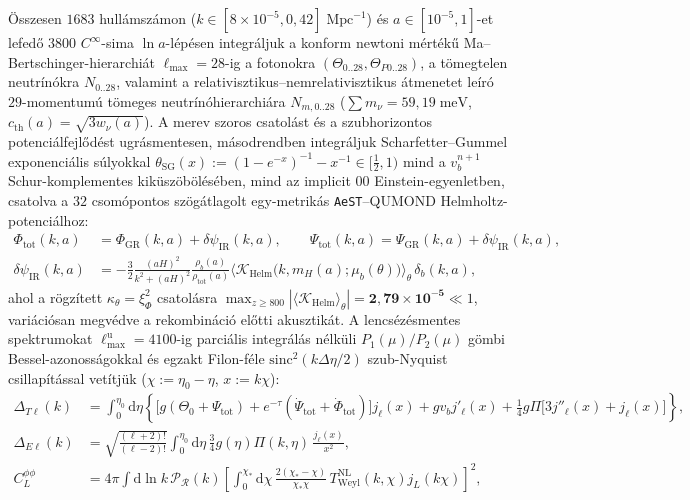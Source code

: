 \documentclass[11pt,a4paper]{article}
\begin{document}
Összesen $1683$ hullámszámon ($k \in [8\times 10^{-5}, 0{,}42]\;\mathrm{Mpc}^{-1}$) és $a \in [10^{-5}, 1]$-et lefedő $3800$ $C^\infty$-sima $\ln a$-lépésen integráljuk a konform newtoni mértékű Ma--Bertschinger-hierarchiát \cite{MaBertschinger1995} $\ell_{\max} = 28$-ig a fotonokra $(\Theta_{0..28}, \Theta_{P0..28})$, a tömegtelen neutrínókra $N_{0..28}$, valamint a relativisztikus--nemrelativisztikus átmenetet leíró $29$-momentumú tömeges neutrínóhierarchiára $N_{m,0..28}$ ($\sum m_\nu = 59{,}19\;\mathrm{meV}$, $c_{\mathrm{th}}(a) = \sqrt{3 w_\nu(a)}$). A merev szoros csatolást és a szubhorizontos potenciálfejlődést ugrásmentesen, másodrendben integráljuk Scharfetter--Gummel exponenciális súlyokkal $\theta_{\mathrm{SG}}(x) := (1 - e^{-x})^{-1} - x^{-1} \in [\frac{1}{2}, 1)$ mind a $v_b^{n+1}$ Schur-komplementes kiküszöbölésében, mind az implicit $00$ Einstein-egyenletben, csatolva a $32$ csomópontos szögátlagolt egy-metrikás \texttt{AeST}--QUMOND Helmholtz-potenciálhoz:
\begin{equation}
\begin{aligned}
  \Phi_{\mathrm{tot}}(k,a) &= \Phi_{\mathrm{GR}}(k,a) + \delta\psi_{\mathrm{IR}}(k,a), \qquad \Psi_{\mathrm{tot}}(k,a) = \Psi_{\mathrm{GR}}(k,a) + \delta\psi_{\mathrm{IR}}(k,a), \\
  \delta\psi_{\mathrm{IR}}(k,a) &= -\frac{3}{2}\frac{(aH)^2}{k^2 + (aH)^2}\frac{\rho_b(a)}{\rho_{\mathrm{tot}}(a)}\bigl\langle\mathcal{K}_{\mathrm{Helm}}\bigl(k, m_H(a); \mu_b(\theta)\bigr)\bigr\rangle_\theta\,\delta_b(k,a),
\end{aligned}
\label{eq:boltzmann-hierarchy}
\end{equation}
ahol a rögzített $\kappa_\theta = \xi_\Phi^2$ csatolásra $\max_{z \ge 800}|\langle\mathcal{K}_{\mathrm{Helm}}\rangle_\theta| = \mathbf{2{,}79\times 10^{-5}} \ll 1$, variációsan megvédve a rekombináció előtti akusztikát. A lencsézésmentes spektrumokat $\ell_{\max}^{\mathrm{u}} = 4100$-ig parciális integrálás nélküli $P_1(\mu)/P_2(\mu)$ gömbi Bessel-azonosságokkal \cite{SeljakZaldarriaga1996} és egzakt Filon-féle $\mathrm{sinc}^2(k\Delta\eta/2)$ szub-Nyquist csillapítással vetítjük ($\chi := \eta_0 - \eta$, $x := k\chi$):
\begin{equation}
\begin{aligned}
  \Delta_{T\ell}(k) &= \int_0^{\eta_0}\!\mathrm{d}\eta\left\{\bigl[g(\Theta_0 + \Psi_{\mathrm{tot}}) + e^{-\tau}(\dot{\Psi}_{\mathrm{tot}} + \dot{\Phi}_{\mathrm{tot}})\bigr]j_\ell(x) + g v_b j'_\ell(x) + \frac{1}{4}g\Pi\bigl[3j''_\ell(x) + j_\ell(x)\bigr]\right\}, \\
  \Delta_{E\ell}(k) &= \sqrt{\frac{(\ell+2)!}{(\ell-2)!}}\int_0^{\eta_0}\!\mathrm{d}\eta\,\frac{3}{4}g(\eta)\Pi(k,\eta)\,\frac{j_\ell(x)}{x^2}, \\
  C_L^{\phi\phi} &= 4\pi\int\mathrm{d}\ln k\,\mathcal{P}_{\mathcal{R}}(k)\left[\int_0^{\chi_*}\!\mathrm{d}\chi\,\frac{2(\chi_* - \chi)}{\chi_*\chi}\,T_{\mathrm{Weyl}}^{\mathrm{NL}}(k,\chi)j_L(k\chi)\right]^{\!2},
\end{aligned}
\label{eq:los-ee}
\end{equation}
\end{document}
